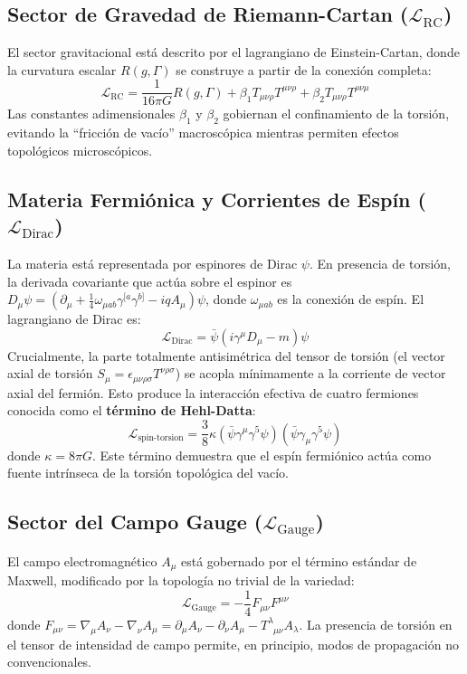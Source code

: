 \documentclass[12pt, a4paper]{article}
\begin{document}
\subsection{Sector de Gravedad de Riemann-Cartan ($\mathcal{L}_{\text{RC}}$)}
El sector gravitacional está descrito por el lagrangiano de Einstein-Cartan, donde la curvatura escalar $R(g, \Gamma)$ se construye a partir de la conexión completa:
\begin{equation}
    \mathcal{L}_{\text{RC}} = \frac{1}{16\pi G} R(g, \Gamma) + \beta_1 T_{\mu\nu\rho}T^{\mu\nu\rho} + \beta_2 T_{\mu\nu\rho}T^{\rho\nu\mu}
\end{equation}
Las constantes adimensionales $\beta_1$ y $\beta_2$ gobiernan el confinamiento de la torsión, evitando la ``fricción de vacío'' macroscópica mientras permiten efectos topológicos microscópicos.

\subsection{Materia Fermiónica y Corrientes de Espín ($\mathcal{L}_{\text{Dirac}}$)}
La materia está representada por espinores de Dirac $\psi$. En presencia de torsión, la derivada covariante que actúa sobre el espinor es $D_\mu \psi = (\partial_\mu + \frac{1}{4}\omega_{\mu ab}\gamma^{[a}\gamma^{b]} - i q A_\mu)\psi$, donde $\omega_{\mu ab}$ es la conexión de espín. El lagrangiano de Dirac es:
\begin{equation}
    \mathcal{L}_{\text{Dirac}} = \bar{\psi} \left( i \gamma^\mu D_\mu - m \right) \psi
\end{equation}
Crucialmente, la parte totalmente antisimétrica del tensor de torsión (el vector axial de torsión $S_\mu = \epsilon_{\mu\nu\rho\sigma}T^{\nu\rho\sigma}$) se acopla mínimamente a la corriente de vector axial del fermión. Esto produce la interacción efectiva de cuatro fermiones conocida como el \textbf{término de Hehl-Datta}:
\begin{equation}
    \mathcal{L}_{\text{spin-torsion}} = \frac{3}{8} \kappa \left( \bar{\psi} \gamma^\mu \gamma^5 \psi \right) \left( \bar{\psi} \gamma_\mu \gamma^5 \psi \right)
\end{equation}
donde $\kappa = 8\pi G$. Este término demuestra que el espín fermiónico actúa como fuente intrínseca de la torsión topológica del vacío.

\subsection{Sector del Campo Gauge ($\mathcal{L}_{\text{Gauge}}$)}
El campo electromagnético $A_\mu$ está gobernado por el término estándar de Maxwell, modificado por la topología no trivial de la variedad:
\begin{equation}
    \mathcal{L}_{\text{Gauge}} = -\frac{1}{4} F_{\mu\nu} F^{\mu\nu}
\end{equation}
donde $F_{\mu\nu} = \nabla_\mu A_\nu - \nabla_\nu A_\mu = \partial_\mu A_\nu - \partial_\nu A_\mu - T^\lambda_{\phantom{\lambda}\mu\nu} A_\lambda$. La presencia de torsión en el tensor de intensidad de campo permite, en principio, modos de propagación no convencionales.
\end{document}
